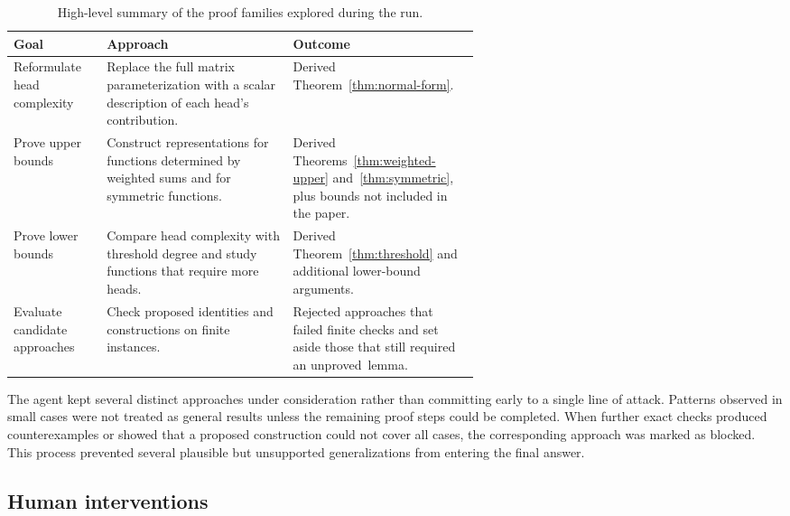 \documentclass{article}
\theoremstyle{definition}
\theoremstyle{plain}
\begin{document}
\begin{table}[H]
  \caption{High-level summary of the proof families explored during the run.}
  \label{tab:routes}
  \centering
  \begin{tabular}{@{}L{0.20\linewidth}L{0.40\linewidth}L{\tabcolsep\relax}@{}}
    \toprule
    \textbf{Goal} & \textbf{Approach} & \textbf{Outcome} \\
    \midrule
    Reformulate head complexity
      & Replace the full matrix parameterization with a scalar description of
        each head's contribution.
      & Derived Theorem~\ref{thm:normal-form}. \\
    \addlinespace[0.45em]
    Prove upper bounds
      & Construct representations for functions determined by weighted sums
        and for symmetric functions.
      & Derived Theorems~\ref{thm:weighted-upper}
        and~\ref{thm:symmetric}, plus bounds not included in the paper. \\
    \addlinespace[0.45em]
    Prove lower bounds
      & Compare head complexity with threshold degree and study functions that
        require more heads.
      & Derived Theorem~\ref{thm:threshold} and additional lower-bound
        arguments. \\
    \addlinespace[0.45em]
    Evaluate candidate approaches
      & Check proposed identities and constructions on finite instances.
      & Rejected approaches that failed finite checks and set aside those that
        still required an unproved~lemma. \\
    \bottomrule
  \end{tabular}
\end{table}

The agent kept several distinct approaches under consideration rather than committing early to a single line of attack. Patterns observed in small cases were not treated as general results unless the remaining proof steps could be completed. When further exact checks produced counterexamples or showed that a proposed construction could not cover all cases, the corresponding approach was marked as blocked. This process prevented several plausible but unsupported generalizations from entering the final answer.

\subsection{Human interventions}
\label{subsec:human-interventions}

\end{document}
